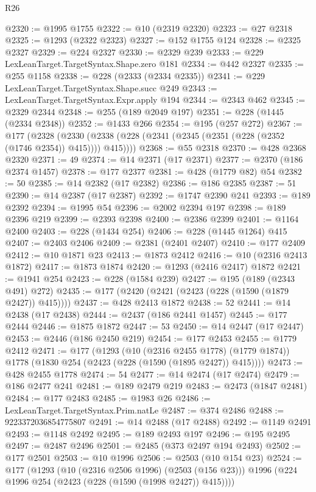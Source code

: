 \begin{lexlean}{R26}
\begin{coremodule}
@2320 := @1995 @1755
@2322 := @10 (@2319 @2320)
@2323 := @27 @2318
@2325 := @1293 (@2322 @2323)
@2327 := @152 @1755 @124
@2328 := @2325 @2327
@2329 := @224 @2327
@2330 := @2329 @239
@2333 := @229 LexLeanTarget.TargetSyntax.Shape.zero @181
@2334 := @442 @2327
@2335 := @255 @1158
@2338 := @228 (@2333 (@2334 @2335))
@2341 := @229 LexLeanTarget.TargetSyntax.Shape.succ @249
@2343 := LexLeanTarget.TargetSyntax.Expr.apply @194
@2344 := @2343 @462
@2345 := @2329 @2344
@2348 := @255 (@189 @2049 @197)
@2351 := @228 (@1445 (@2334 @2348))
@2352 := @1433 @266
@2354 := @195 (@257 @272)
@2367 := @177
    (@2328 (@2330 (@2338 (@228 (@2341 (@2345 (@2351 (@228 (@2352 (@1746 @2354)) @415)))) @415))))
@2368 := @55 @2318
@2370 := @428 @2368 @2320
@2371 := 49
@2374 := @14 @2371 (@17 @2371)
@2377 := @2370 (@186 @2374 @1457)
@2378 := @177 @2377
@2381 := @428 (@1779 @82) @54
@2382 := 50
@2385 := @14 @2382 (@17 @2382)
@2386 := @186 @2385
@2387 := 51
@2390 := @14 @2387 (@17 @2387)
@2392 := @1747 @2390 @241
@2393 := @189 @2392
@2394 := @1995 @54
@2396 := @2002 @2394 @197
@2398 := @189 @2396 @219
@2399 := @2393 @2398
@2400 := @2386 @2399
@2401 := @1164 @2400
@2403 := @228 (@1434 @254)
@2406 := @228 (@1445 @1264) @415
@2407 := @2403 @2406
@2409 := @2381 (@2401 @2407)
@2410 := @177 @2409
@2412 := @10 @1871 @23
@2413 := @1873 @2412
@2416 := @10 (@2316 @2413 @1872)
@2417 := @1873 @1874
@2420 := @1293 (@2416 @2417) @1872
@2421 := @1941 @254
@2423 := @228 (@1584 @239)
@2427 := @195 (@189 (@2343 @491) @272)
@2435 := @177 (@2420 (@2421 (@2423 (@228 (@1590 (@1879 @2427)) @415))))
@2437 := @428 @2413 @1872
@2438 := 52
@2441 := @14 @2438 (@17 @2438)
@2444 := @2437 (@186 @2441 @1457)
@2445 := @177 @2444
@2446 := @1875 @1872
@2447 := 53
@2450 := @14 @2447 (@17 @2447)
@2453 := @2446 (@186 @2450 @219)
@2454 := @177 @2453
@2455 := @1779 @2412
@2471 := @177
    (@1293
      (@10 (@2316 @2455 @1778) (@1779 @1874))
      @1778
      (@1830 @254 (@2423 (@228 (@1590 (@1895 @2427)) @415))))
@2473 := @428 @2455 @1778
@2474 := 54
@2477 := @14 @2474 (@17 @2474)
@2479 := @186 @2477 @241
@2481 := @189 @2479 @219
@2483 := @2473 (@1847 @2481)
@2484 := @177 @2483
@2485 := @1983 @26
@2486 := LexLeanTarget.TargetSyntax.Prim.natLe
@2487 := @374 @2486
@2488 := 9223372036854775807
@2491 := @14 @2488 (@17 @2488)
@2492 := @1149 @2491
@2493 := @1148 @2492
@2495 := @189 @2493 @197
@2496 := @195 @2495
@2497 := @2487 @2496
@2501 := @2485 (@373 @2497 @194 @2493)
@2502 := @177 @2501
@2503 := @10 @1996
@2506 := @2503 (@10 @154 @23)
@2524 := @177
    (@1293
      (@10 (@2316 @2506 @1996) (@2503 (@156 @23)))
      @1996
      (@224 @1996 @254 (@2423 (@228 (@1590 (@1998 @2427)) @415))))

\end{coremodule}
\end{lexlean}
